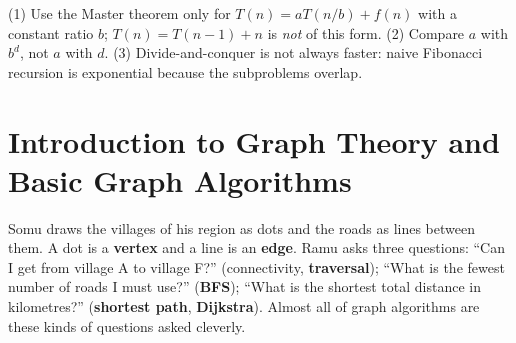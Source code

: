 \documentclass[11pt,a4paper]{article}
\begin{document}
\begin{trap}
(1) Use the Master theorem only for $T(n)=aT(n/b)+f(n)$ with a constant ratio $b$; $T(n)=T(n-1)+n$ is \emph{not} of this form. (2) Compare $a$ with $b^{d}$, not $a$ with $d$. (3) Divide-and-conquer is not always faster: naive Fibonacci recursion is exponential because the subproblems overlap.
\end{trap}

\newpage
\section{Introduction to Graph Theory and Basic Graph Algorithms}

\begin{story}
Somu draws the villages of his region as dots and the roads as lines between them. A dot is a \textbf{vertex} and a line is an \textbf{edge}. Ramu asks three questions: ``Can I get from village A to village F?'' (connectivity, \textbf{traversal}); ``What is the fewest number of roads I must use?'' (\textbf{BFS}); ``What is the shortest total distance in kilometres?'' (\textbf{shortest path}, \textbf{Dijkstra}). Almost all of graph algorithms are these kinds of questions asked cleverly.
\end{story}
\end{document}
